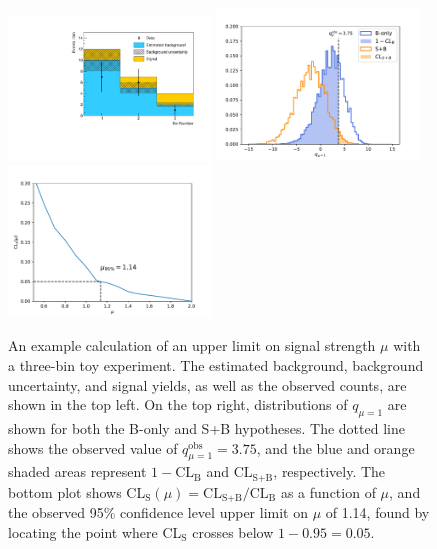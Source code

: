 \begin{figure}[htbp]
  \begin{center}
    \includegraphics[width=0.48\textwidth]{figs/results/toy_exp.pdf}
    \includegraphics[width=0.48\textwidth]{figs/results/qmu_dist.pdf} \\
    \includegraphics[width=0.48\textwidth]{figs/results/cls.pdf}
    \caption{An example calculation of an upper limit on signal strength $\mu$ with a three-bin toy experiment.
      The estimated background, background uncertainty, and signal yields, as well as the observed counts, are shown
      in the top left. On the top right, distributions of $q_{\mu=1}$ are shown for both the B-only and S+B
      hypotheses. The dotted line shows the observed value of $q_{\mu=1}^\text{obs}=3.75$, and the blue and orange
      shaded areas represent $1-\text{CL}_\text{B}$ and $\text{CL}_\text{S+B}$, respectively. The bottom plot
      shows CL$_\text{S}(\mu)=\text{CL}_\text{S+B}/\text{CL}_\text{B}$ as a function of $\mu$, and the observed
      95\% confidence level upper limit on $\mu$ of 1.14, found by locating the point where CL$_\text{S}$
      crosses below $1-0.95=0.05$.
            }
    \label{fig:results_cls}
  \end{center}
\end{figure}

